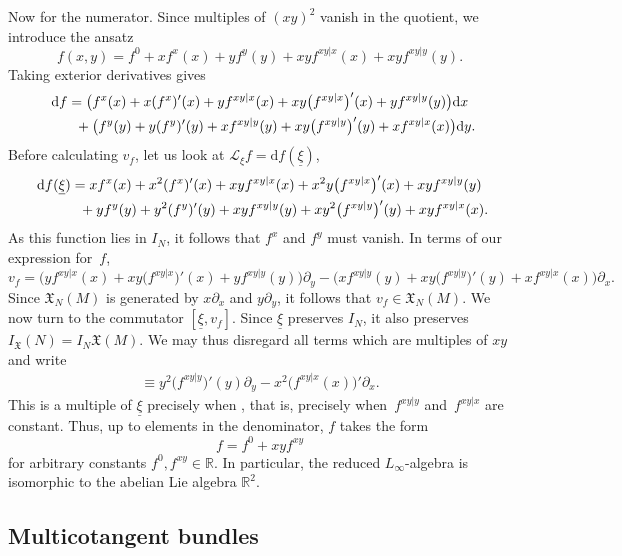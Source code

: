 \documentclass[pdftex]{sigma}
\numberwithin{equation}{section}
\newcommand{\R}{\mathbb{R}}
\newcommand{\tgtvf}{\mathfrak X_N(M)}
\newcommand{\vanvf}{I_{\mathfrak{X}}(N)}%
\renewcommand{\L}{\mathscr{L}}
\renewcommand{\d}{\mathrm{d}}
\begin{document}
Now for the numerator. Since multiples of $(xy)^2$ vanish in the quotient, we introduce the ansatz
\[
	f(x,y)= f^0 + xf^x(x) +yf^y(y) + xyf^{xy|x}(x) + xyf^{xy|y}(y).
\]
Taking exterior derivatives gives
\begin{gather*}
	\d f= \bigl(f^x(x)+x(f^x)'(x)+ yf^{xy|x}(x) +xy\bigl(f^{xy|x}\bigr)'(x)   +yf^{xy|y}(y)\bigr)\d x		\\ \hphantom{\d f=}{}
		+ \bigl(f^y(y)+y(f^y)'(y)+ xf^{xy|y}(y) +xy\bigl(f^{xy|y}\bigr)'(y)   +xf^{xy|x}(x)\bigr)\d y.
\end{gather*}
Before calculating $v_f$, let us look at $\L_\xi f=\d f(\underline{\xi})$,
\begin{gather*}
	\d f(\underline{\xi})
        =	xf^x(x)+x^2(f^x)'(x)+ xyf^{xy|x}(x) +x^2y\bigl(f^{xy|x}\bigr)'(x)   +xyf^{xy|y}(y)	\\ \hphantom{\d f(\underline{\xi})=}{}
		+	yf^y(y)+y^2(f^y)'(y)+ xyf^{xy|y}(y) +xy^2\bigl(f^{xy|y}\bigr)'(y)   +xyf^{xy|x}(x).
\end{gather*}
As this function lies in $I_N$, it follows that $f^x$ and $f^y$ must vanish. In terms of our expression for~$f$,
\[
	v_f=    \bigl(yf^{xy|x}(x) +xy\bigl(f^{xy|x}\bigr)'(x)   +yf^{xy|y}(y)\bigr)\partial_y - \bigl(xf^{xy|y}(y) +xy\bigl(f^{xy|y}\bigr)'(y)   +xf^{xy|x}(x)\bigr)\partial_x.
\]
Since $\tgtvf$ is generated by $x\partial_x$ and $y\partial_y$, it follows that $v_f\in\tgtvf$. We now turn to the commutator $[\underline\xi,v_f]$. Since $\underline\xi$ preserves $I_N$, it also preserves $\vanvf=I_N\mathfrak X(M)$. We may thus disregard all terms which are multiples of $xy$ and write
\begin{align*}
	[\underline\xi,v_f]\equiv y^2\bigl(f^{xy|y}\bigr)'(y)\partial_y - x^2\bigl(f^{xy|x}(x)\bigr)'\partial_x.
\end{align*}
This is a multiple of $\underline\xi$ precisely when , that is, precisely when~$f^{xy|y}$ and~$f^{xy|x}$ are constant. Thus, up to elements in the denominator, $f$ takes the form
\[
f=f^0 + xyf^{xy}
\]
for arbitrary constants $f^0, f^{xy}\in\R$. In particular, the reduced $L_\infty$-algebra is isomorphic to the abelian Lie algebra $\mathbb R^2$.


\subsection{Multicotangent bundles}\label{Ssec:multicotangent}
\end{document}
